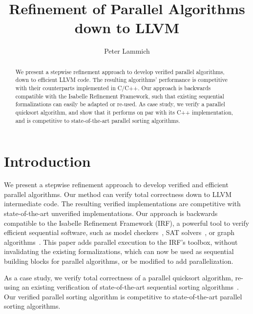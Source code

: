 \documentclass[a4paper,UKenglish,cleveref, autoref, thm-restate]{lipics-v2021}
\title{Refinement of Parallel Algorithms down to LLVM}
\author{Peter Lammich}{University of Twente, Netherlands}{p.lammich@utwente.nl}{https://orcid.org/0000-0003-3576-0504}{}%
\begin{document}
\maketitle

\begin{abstract}
  We present a stepwise refinement approach to develop
  verified parallel algorithms, down to efficient LLVM code.
  The resulting algorithms' performance is competitive with their
  counterparts implemented in C/C++.
%
  Our approach is backwards compatible with the Isabelle Refinement Framework,
  such that existing sequential formalizations can easily be adapted
  or re-used.
%
  As case study, we verify a parallel quicksort algorithm, and
  show that it performs on par with its C++ implementation,
  and is competitive to state-of-the-art parallel sorting algorithms.
\end{abstract}


\section{Introduction}
%

We present a stepwise refinement approach to develop
verified and efficient parallel algorithms. Our method can verify total correctness down to LLVM intermediate code.
The resulting verified implementations are competitive with state-of-the-art
unverified implementations. Our approach is backwards compatible to
the Isabelle Refinement Framework (IRF), a powerful tool to verify efficient sequential software,
such as model checkers~\cite{ELNN13,BrLa18,WiLa18}, SAT solvers~\cite{La17_CADE,La17_SAT,FBL18},
or graph algorithms~\cite{La14,LaSe16,LaSe19}.
This paper adds parallel execution to the IRF's toolbox, without invalidating the existing formalizations,
which can now be used as sequential building blocks for parallel algorithms, or be modified to add
parallelization.

As a case study, we verify total correctness of a parallel quicksort algorithm,
re-using an existing verification of state-of-the-art sequential sorting algorithms~\cite{La20}.
Our verified parallel sorting algorithm is competitive to state-of-the-art parallel sorting algorithms.
\end{document}
